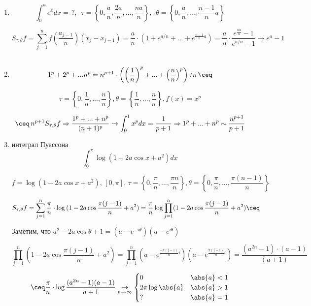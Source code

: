 \begin{example}
    \begin{enumerate}
        \item \[
            \int_0^{a} e^x dx = \,? , \,\,\, \tau = \left\{ 0, \frac{a}{n}, \frac{2a}{n}, ..., \frac{na}{n} \right\}, \,\,\, \theta = \left\{ 0, \frac{a}{n}, ... , \frac{n - 1}{n} a \right\}
        \]
    
        \[
            S_{\tau, \theta} f = \sum_{j = 1}^n f \left( \frac{a_{j - 1}}{n} \right)(x_j - x_{j - 1}) = \frac{a}{n} \cdot \left( 1 + e ^ {a / n} + ... + e ^{\frac{n - 1}{n} a} \right) = \frac{a}{n} \cdot \frac{e ^ {\frac{na}{n}} - 1}{e ^ {a / n} - 1} \to e^a - 1
        \]
        \\
        \item
        \[
            1 ^ p + 2 ^ p + ... n ^ p = n ^ {p + 1} \cdot \left( \left( \frac{1}{n} \right) ^ p + ... + \left( \frac{n}{n} \right) ^ p \right)/ n \, \ceq
        \]

        \[
            \tau = \left\{ 0, \frac{1}{n}, ... , \frac{n}{n} \right\}, \theta = \left\{\frac{1}{n}, ... , \frac{n}{n}  \right\}, f(x) = x ^ p
        \]

        \[
            \ceq \, n ^ {p + 1} S_{\tau, \theta} f \Rightarrow \frac{1 ^ p + ... + n ^ p}{(n + 1) ^ p} \to \int_0^1 x ^ p dx = \frac{1}{p + 1} \Rightarrow 1 ^ p + ... + n ^ p \sim \frac{n ^ {p + 1}}{p + 1}
        \]

        \item интеграл Пуассона
        \[
            \int_0^\pi \log{(1 - 2a \cos{x} + a ^ 2)} dx
        \]

        \[
            f = \log{(1 - 2a \cos{x} + a ^ 2)},\, [0, \pi],\, \tau = \left\{0, \frac{\pi}{n}, ... , \frac{\pi n}{n} \right\}, \theta = \left\{0, \frac{\pi}{n}, ... , \frac{\pi (n - 1)}{n} \right\}
        \]

        \[
            S_{\tau, \theta} f = \sum_{j = 1}^n \frac{\pi}{n} \cdot \log{(1 - 2a \cos{\frac{\pi (j - 1)}{n} + a ^ 2})} = \frac{\pi}{n} \log{\prod_{j = 1}^n (1 - 2a \cos{\frac{\pi (j - 1)}{n} + a ^ 2})} \ceq
        \]

        Заметим, что $a ^ 2 - 2a \cos{\theta} + 1 = (a - e ^ {-i \theta})(a - e ^ {i \theta})$

        \[
            \prod_{j = 1}^n (1 - 2a \cos{\frac{\pi (j - 1)}{n} + a ^ 2}) =  \prod_{j = 1}^n (a - e ^ {\frac{-\pi (j - 1)}{n} i })(a - e ^ {\frac{\pi (j - 1)}{n} i }) = \frac{(a ^ {2n} - 1) \cdot (a - 1)}{(a + 1)}
        \]

        \[
            \ceq \frac{\pi}{n} \cdot \log{\frac{(a ^ {2n} - 1)(a - 1)}{a + 1}} \underset{n \to \infty}{\to} \begin{cases}
                0 & \abs{a} < 1 \\
                2 \pi \log{\abs{a}} & \abs{a} > 1 \\
                ? & \abs{a} = 1
              \end{cases}
        \]
    \end{enumerate}
    
\end{example}


